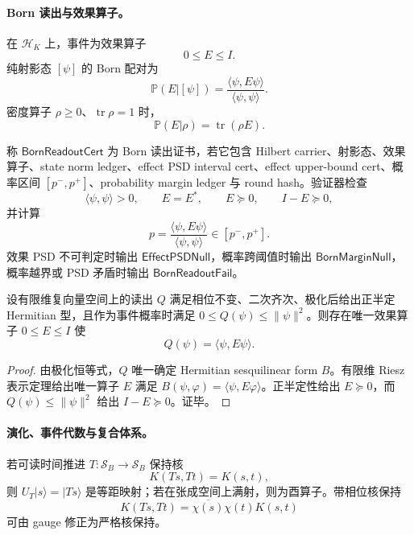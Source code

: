 \paragraph{Born 读出与效果算子。}
在 \(\mathcal H_K\) 上，事件为效果算子
\[
0\le E\le I.
\]
纯射影态 \([\psi]\) 的 Born 配对为
\[
\boxed{
\mathbb P(E|[\psi])
=
\frac{\langle\psi,E\psi\rangle}{\langle\psi,\psi\rangle}.
}
\]
密度算子 \(\rho\ge0\)、\(\operatorname{tr}\rho=1\) 时，
\[
\mathbb P(E|\rho)=\operatorname{tr}(\rho E).
\]

\begin{definition}\label{def:typed-address-biaxial-completion-born-readout-cert}
称 \(\mathsf{BornReadoutCert}\) 为 Born 读出证书，若它包含 Hilbert carrier、射影态、效果算子、state norm ledger、effect PSD interval cert、effect upper-bound cert、概率区间 \([p^-,p^+]\)、probability margin ledger 与 round hash。验证器检查
\[
\langle\psi,\psi\rangle>0,\qquad
E=E^*,\qquad
E\succeq0,\qquad
I-E\succeq0,
\]
并计算
\[
p=\frac{\langle\psi,E\psi\rangle}{\langle\psi,\psi\rangle}\in[p^-,p^+].
\]
效果 PSD 不可判定时输出 \(\mathsf{EffectPSDNull}\)，概率跨阈值时输出 \(\mathsf{BornMarginNull}\)，概率越界或 PSD 矛盾时输出 \(\mathsf{BornReadoutFail}\)。
\end{definition}

\begin{theorem}\label{thm:typed-address-biaxial-completion-quadratic-readout-born-form}
设有限维复向量空间上的读出 \(Q\) 满足相位不变、二次齐次、极化后给出正半定 Hermitian 型，且作为事件概率时满足 \(0\le Q(\psi)\le\|\psi\|^2\)。则存在唯一效果算子 \(0\le E\le I\) 使
\[
Q(\psi)=\langle\psi,E\psi\rangle.
\]
\end{theorem}
\begin{proof}
由极化恒等式，\(Q\) 唯一确定 Hermitian sesquilinear form \(B\)。有限维 Riesz 表示定理给出唯一算子 \(E\) 满足 \(B(\psi,\varphi)=\langle\psi,E\varphi\rangle\)。正半定性给出 \(E\succeq0\)，而 \(Q(\psi)\le\|\psi\|^2\) 给出 \(I-E\succeq0\)。证毕。
\end{proof}

\paragraph{演化、事件代数与复合体系。}
若可读时间推进 \(T:\mathcal S_B\to\mathcal S_B\) 保持核
\[
K(Ts,Tt)=K(s,t),
\]
则 \(U_T|s\rangle=|Ts\rangle\) 是等距映射；若在张成空间上满射，则为酉算子。带相位核保持
\[
K(Ts,Tt)=\overline{\chi(s)}\chi(t)K(s,t)
\]
可由 gauge 修正为严格核保持。

